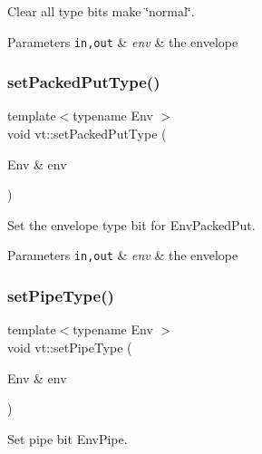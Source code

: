 Clear all type bits make \char`\"{}normal\char`\"{}. 


\begin{DoxyParams}[1]{Parameters}
\mbox{\tt in,out}  & {\em env} & the envelope \\
\hline
\end{DoxyParams}
\mbox{\label{namespacevt_a2206947364b94e9c7dba38df257d095b}} 
\subsubsection{\texorpdfstring{set\+Packed\+Put\+Type()}{setPackedPutType()}}
{\footnotesize\ttfamily template$<$typename Env $>$ \\
void vt\+::set\+Packed\+Put\+Type (\begin{DoxyParamCaption}\item[{Env \&}]{env }\end{DoxyParamCaption})\hspace{0.3cm}{\ttfamily [inline]}}



Set the envelope type bit for {\ttfamily Env\+Packed\+Put}. 


\begin{DoxyParams}[1]{Parameters}
\mbox{\tt in,out}  & {\em env} & the envelope \\
\hline
\end{DoxyParams}
\mbox{\label{namespacevt_a4ecba7a91cd1d5a6b6473cbac2042c2b}} 
\subsubsection{\texorpdfstring{set\+Pipe\+Type()}{setPipeType()}}
{\footnotesize\ttfamily template$<$typename Env $>$ \\
void vt\+::set\+Pipe\+Type (\begin{DoxyParamCaption}\item[{Env \&}]{env }\end{DoxyParamCaption})\hspace{0.3cm}{\ttfamily [inline]}}



Set pipe bit {\ttfamily Env\+Pipe}. 


